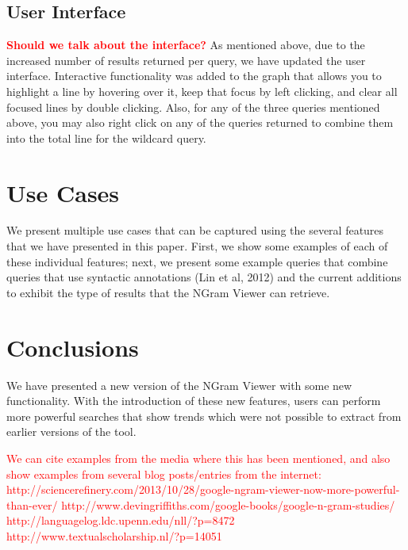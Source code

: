 \documentclass[11pt]{article}
\begin{document}
\subsection{User Interface}
\label{sec:userint}
\textcolor{red}{\bf Should we talk about the interface?}
As mentioned above, due to the increased number of results returned per query, we have updated the user interface. Interactive functionality was added to the graph that allows you to highlight a line by hovering over it, keep that focus by left clicking, and clear all focused lines by double clicking. Also, for any of the three queries mentioned above, you may also right click on any of the queries returned to combine them into the total line for the wildcard query.


\section{Use Cases}
\label{sec:usecases}
We present multiple use cases that can be captured using the several features that we have presented in this paper. First, we show some examples of each of these individual features; next, we present some example queries that combine queries that use syntactic annotations (Lin et al, 2012) and the current additions to exhibit the type of results that the NGram Viewer can retrieve.



\section{Conclusions}
We have presented a new version of the NGram Viewer with some new functionality. With the introduction of these new features, users can perform more powerful searches that show trends which were not possible to extract from earlier versions of the tool. 

\textcolor{red}{We can cite examples from the media where this has been mentioned, and also show examples from several blog posts/entries from the internet:
http://sciencerefinery.com/2013/10/28/google-ngram-viewer-now-more-powerful-than-ever/
http://www.devingriffiths.com/google-books/google-n-gram-studies/
http://languagelog.ldc.upenn.edu/nll/?p=8472
http://www.textualscholarship.nl/?p=14051}





\end{document}
